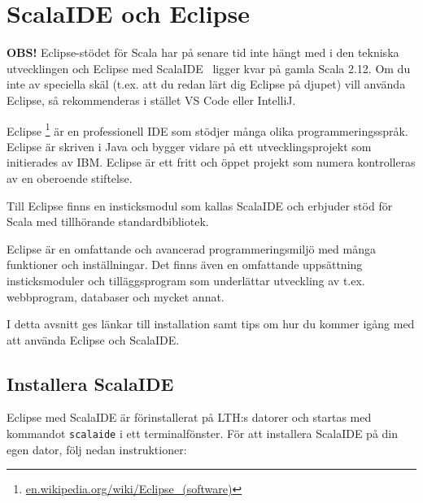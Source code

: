 
\section{ScalaIDE och Eclipse}\label{appendix:ide:eclipse}

\begin{oframed}
  \noindent \textbf{OBS!} Eclipse-stödet för Scala har på senare tid inte hängt med i den tekniska utvecklingen och Eclipse med ScalaIDE \ScalaIDEVersion~ligger kvar på gamla Scala 2.12. Om du inte av speciella skäl (t.ex. att du redan lärt dig Eclipse på djupet) vill använda Eclipse, så rekommenderas i stället VS Code eller IntelliJ.  
  \end{oframed}
  

Eclipse%
\footnote{\href{https://en.wikipedia.org/wiki/Eclipse_(software)}{en.wikipedia.org/wiki/Eclipse\_(software)}}
är en professionell IDE som stödjer många olika programmeringsspråk. Eclipse är skriven i Java och bygger vidare på ett utvecklingsprojekt som initierades av IBM. Eclipse är ett fritt och öppet projekt som numera kontrolleras av en oberoende stiftelse.

Till Eclipse finns en insticksmodul  som kallas ScalaIDE och erbjuder stöd för Scala med tillhörande standardbibliotek.

Eclipse är en omfattande och avancerad programmeringsmiljö med många funktioner och inställningar. Det finns även en omfattande uppsättning insticksmoduler och tilläggsprogram som underlättar utveckling av t.ex. webbprogram, databaser och mycket annat.

I detta avsnitt ges länkar till installation samt tips om hur du kommer igång med att använda Eclipse och ScalaIDE. 



\subsection{Installera ScalaIDE}\label{appendix:ide:eclipse:install}

Eclipse med ScalaIDE är förinstallerat på LTH:s datorer och startas med kommandot \texttt{scalaide} i ett terminalfönster.
För att installera ScalaIDE på din egen dator, följ nedan instruktioner:

